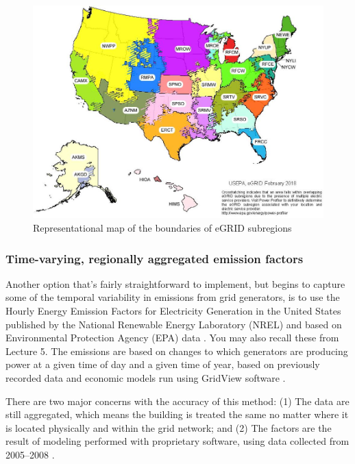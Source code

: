 \documentclass[10pt]{article}
\begin{document}
\begin{figure}[h]
\centering
\includegraphics[width=5in]{extras18/egridFeb2018.jpg}
\caption{Representational map of the boundaries of eGRID subregions  \cite{eGRIDsupportdoc2016}}
\label{egr}
\end{figure}



\subsubsection{Time-varying, regionally aggregated emission factors}

Another option that's fairly straightforward to implement, but begins to capture some of the temporal variability in emissions from grid generators, is to use the Hourly Energy Emission Factors for Electricity Generation in the United States published by the National Renewable Energy Laboratory (NREL) and based on Environmental Protection Agency (EPA) data \cite{EPAfactors}. You may also recall these from Lecture 5. The emissions are based on changes to which generators are producing power at a given time of day and a given time of year, based on previously recorded data \cite{eGRID} and economic models run using GridView software \cite{GridView}.

There are two major concerns with the accuracy of this method: (1) The data are still aggregated, which means the building is treated the same no matter where it is located physically and within the grid network; and (2) The factors are the result of modeling performed with proprietary software, using data collected from 2005--2008 \cite{EPAfactors}.
\end{document}
